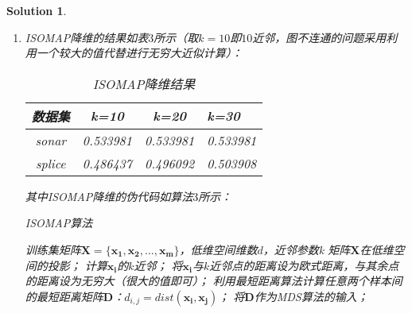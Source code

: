 \documentclass[a4paper,UTF8]{article}
\numberwithin{equation}{section}
\newtheorem*{solution}{Solution}
\begin{document}
\begin{solution}
\begin{enumerate}
	其中SVD降维的伪代码如算法$2$所示：
	\begin{algorithm}[htbp]  
        \caption{SVD算法}  
        \begin{algorithmic}[1] %
 			\Require 训练集矩阵$\mathbf{X}=\{\mathbf{x_1}, \mathbf{x_2},\dots,\mathbf{x_m}\}$，低维空间维数$d$ 
	        \Ensure 投影矩阵$\mathbf{W}$及均值向量$\bar{\mathbf{x}}$  
	        \State 求均值向量：$\bar{\mathbf{x}} \gets \frac{1}{m}\sum_{i=1}^{m}\mathbf{x_i}$；
	        \State 对所有样本进行中心化得到矩阵$\mathbf{C}$：$\mathbf{c_i} \gets \mathbf{x_i} - \bar{\mathbf{x}}$；
            \State 对矩阵$\mathbf{C}$进行奇异值分解：$\mathbf{C}=\mathbf{U}\mathbf{\sum}\mathbf{V^T}$；
            \State 令$\mathbf{W}$为$\mathbf{V^T}$的前$d$行组成的矩阵的转置；
            \State {}
        \end{algorithmic}  
    \end{algorithm} 

    对新数据降维时，只需用均值向量进行中心化后乘以投影矩阵即可。
\newpage
	\item ISOMAP降维的结果如表$3$所示（取$k=10$即$10$近邻，图不连通的问题采用利用一个较大的值代替进行无穷大近似计算）：
	\begin{table}[htbp]
  		\centering
  		\begin{tabular}{cccp{38mm}}
	    \toprule
	    \textbf{数据集} & \textbf{k=10} & \textbf{k=20} & \textbf{k=30} \\
	    \midrule
	    sonar  & 0.533981 & 0.533981 & 0.533981\\
	    splice & 0.486437 & 0.496092 & 0.503908\\
	    \bottomrule
  		\end{tabular}
  		\caption{ISOMAP降维结果}\label{table:1}
	\end{table}

	其中ISOMAP降维的伪代码如算法$3$所示：
	\begin{algorithm}[htbp]  
        \caption{ISOMAP算法}  
        \begin{algorithmic}[1] %
 			\Require 训练集矩阵$\mathbf{X}=\{\mathbf{x_1}, \mathbf{x_2},\dots,\mathbf{x_m}\}$，低维空间维数$d$，近邻参数k
	        \Ensure  矩阵$\mathbf{X}$在低维空间的投影；
	        	\State 计算$\mathbf{x_i}$的$k$近邻；
	        	\State 将$\mathbf{x_i}$与$k$近邻点的距离设为欧式距离，与其余点的距离设为无穷大（很大的值即可）；
	        \EndFor
	        \State 利用最短距离算法计算任意两个样本间的最短距离矩阵$\mathbf{D}$：$d_{i,j} = dist(\mathbf{x_i}, \mathbf{x_j})$；
	        \State 将$\mathbf{D}$作为MDS算法的输入；
            \State {}
        \end{algorithmic}  
    \end{algorithm} 


\end{enumerate}
\end{solution}
\end{document}
